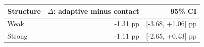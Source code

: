 \begin{tabular}{lrr}
\toprule
Structure & $\Delta$: adaptive minus contact & 95\% CI \\
\midrule
Weak & -1.31 pp & [-3.68, +1.06] pp \\
Strong & -1.11 pp & [-2.65, +0.43] pp \\
\bottomrule
\end{tabular}
